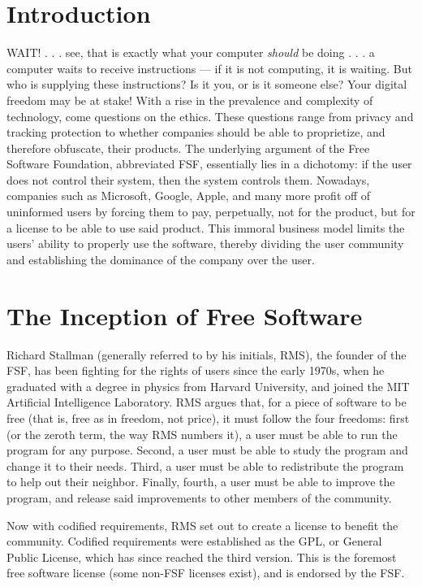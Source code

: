 \documentclass[12pt]{article}
\begin{document}
\begin{multicols}{3}

  \section*{\small Introduction}

  WAIT! . . . see, that is exactly what your computer \textit{should} be doing . . . a computer waits to receive instructions — if it is not computing, it is waiting. But who is supplying these instructions? Is it you, or is it someone else? Your digital freedom may be at stake! With a rise in the prevalence and complexity of technology, come questions on the ethics. These questions range from privacy and tracking protection to whether companies should be able to proprietize, and therefore obfuscate, their products. The underlying argument of the Free Software Foundation, abbreviated FSF, essentially lies in a dichotomy: if the user does not control their system, then the system controls them. Nowadays, companies such as Microsoft, Google, Apple, and many more profit off of uninformed users by forcing them to pay, perpetually, not for the product, but for a license to be able to use said product. This immoral business model limits the users' ability to properly use the software, thereby dividing the user community and establishing the dominance of the company over the user. 

  \section*{\small The Inception of Free Software}

  Richard Stallman (generally referred to by his initials, RMS), the founder of the FSF, has been fighting for the rights of users since the early 1970s, when he graduated with a degree in physics from Harvard University, and joined the MIT Artificial Intelligence Laboratory.  RMS argues that, for a piece of software to be free (that is, free as in freedom, not price), it must follow the four freedoms: first (or the zeroth term, the way RMS numbers it), a user must be able to run the program for any purpose. Second, a user must be able to study the program and change it to their needs. Third, a user must be able to redistribute the program to help out their neighbor. Finally, fourth, a user must be able to improve the program, and release said improvements to other members of the community. 

  Now with codified requirements, RMS set out to create a license to benefit the community. Codified requirements were established as the GPL, or General Public License, which has since reached the third version. This is the foremost free software license (some non-FSF licenses exist), and is endorsed by the FSF. 


\end{multicols}
\end{document}
